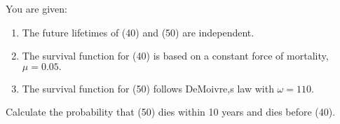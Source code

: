  You are given:
\begin{enumerate}
\item The future lifetimes of (40) and (50) are independent.
\item The survival function for (40) is based on a constant force of mortality, $\mu= 0.05.$
\item The survival function for (50) follows DeMoivre,s law with $\omega =110.$
\end{enumerate}
Calculate the probability that (50) dies within 10 years and dies before (40).
    
